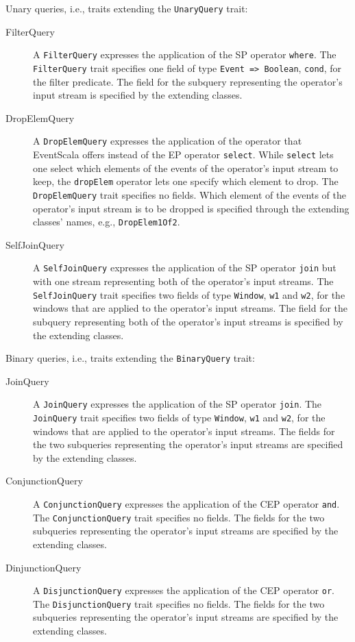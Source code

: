 \documentclass[article, 10pt, type=bsc, colorback, accentcolor=tud8b, parskip=half, bibliography=totocnumbered]{tudthesis}
\begin{document}
Unary queries, i.e., traits extending the \lstinline{UnaryQuery} trait:

\begin{description}
\item[FilterQuery]
A \lstinline{FilterQuery} expresses the application of the SP operator \lstinline{where}.
The \lstinline{FilterQuery} trait specifies one field of type \lstinline{Event => Boolean}, \lstinline{cond}, for the filter predicate.
The field for the subquery representing the operator's input stream is specified by the extending classes.
\item[DropElemQuery]
A \lstinline{DropElemQuery} expresses the application of the operator that EventScala offers instead of the EP operator \lstinline{select}.
While \lstinline{select} lets one select which elements of the events of the operator's input stream to keep, the \lstinline{dropElem} operator lets one specify which element to drop.
The \lstinline{DropElemQuery} trait specifies no fields.
Which element of the events of the operator's input stream is to be dropped is specified through the extending classes' names, e.g., \lstinline{DropElem1Of2}.
\item[SelfJoinQuery]
A \lstinline{SelfJoinQuery} expresses the application of the SP operator \lstinline{join} but with one stream representing both of the operator's input streams.
The \lstinline{SelfJoinQuery} trait specifies two fields of type \lstinline{Window}, \lstinline{w1} and \lstinline{w2}, for the windows that are applied to the operator's input streams.
The field for the subquery representing both of the operator's input streams is specified by the extending classes.
\end{description}

Binary queries, i.e., traits extending the \lstinline{BinaryQuery} trait:

\begin{description}
\item[JoinQuery]
A \lstinline{JoinQuery} expresses the application of the SP operator \lstinline{join}.
The \lstinline{JoinQuery} trait specifies two fields of type \lstinline{Window}, \lstinline{w1} and \lstinline{w2}, for the windows that are applied to the operator's input streams.
The fields for the two subqueries representing the operator's input streams are specified by the extending classes.
\item[ConjunctionQuery]
A \lstinline{ConjunctionQuery} expresses the application of the CEP operator \lstinline{and}.
The \lstinline{ConjunctionQuery} trait specifies no fields.
The fields for the two subqueries representing the operator's input streams are specified by the extending classes.
\item[DinjunctionQuery]
A \lstinline{DisjunctionQuery} expresses the application of the CEP operator \lstinline{or}.
The \lstinline{DisjunctionQuery} trait specifies no fields.
The fields for the two subqueries representing the operator's input streams are specified by the extending classes.
\end{description}
\end{document}

